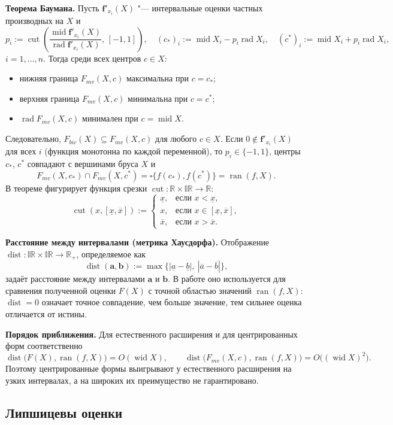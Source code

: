 \documentclass[12pt,a4paper]{article}
\newcommand{\ran}{\operatorname{ran}}
\newcommand{\rad}{\operatorname{rad}}
\newcommand{\wid}{\operatorname{wid}}
\newcommand{\Mid}{\operatorname{mid}}
\newcommand{\dist}{\operatorname{dist}}
\newcommand{\cut}{\operatorname{cut}}
\newcommand{\bff}{\mathbf{f}}
\begin{document}
\textbf{Теорема Баумана.} Пусть $\bff'_{x_i}(X)$ "--- интервальные оценки частных производных на $X$ и
\[
p_i:=\cut\!\left(\frac{\Mid\bff'_{x_i}(X)}{\rad\bff'_{x_i}(X)},\,[-1,1]\right),\quad
(c_{*})_i:=\Mid X_i-p_i\rad X_i,\quad (c^{*})_i:=\Mid X_i+p_i\rad X_i,
\]
$i=1,\dots,n$. Тогда среди всех центров $c\in X$:
\begin{itemize}
\item нижняя граница $F_{mv}(X,c)$ максимальна при $c=c_{*}$;
\item верхняя граница $F_{mv}(X,c)$ минимальна при $c=c^{*}$;
\item $\rad F_{mv}(X,c)$ минимален при $c=\Mid X$.
\end{itemize}
Следовательно, $F_{bic}(X)\subseteq F_{mv}(X,c)$ для любого $c\in X$. Если $0\notin\bff'_{x_i}(X)$ для всех $i$ (функция монотонна по каждой переменной), то $p_i\in\{-1,1\}$, центры $c_{*}$, $c^{*}$ совпадают с вершинами бруса $X$ и
\[
F_{mv}(X,c_{*})\cap F_{mv}(X,c^{*})=\square\{f(c_{*}),f(c^{*})\}=\ran(f,X).
\]
В теореме фигурирует функция срезки $\cut:\mathbb{R}\times\mathbb{IR}\to\mathbb{R}$:
\[
\cut(x,[\underline{x},\overline{x}]):=
\begin{cases}
\underline{x}, & \text{если } x<\underline{x},\\
x, & \text{если } x\in[\underline{x},\overline{x}],\\
\overline{x}, & \text{если } x>\overline{x}.
\end{cases}
\]

\textbf{Расстояние между интервалами (метрика Хаусдорфа).} Отображение $\dist:\mathbb{IR}\times\mathbb{IR}\to\mathbb{R}_{+}$, определяемое как
\[
\dist(\mathbf{a},\mathbf{b}):=\max\{|\underline{a}-\underline{b}|,\ |\overline{a}-\overline{b}|\},
\]
задаёт расстояние между интервалами $\mathbf{a}$ и $\mathbf{b}$. В работе оно используется для сравнения полученной оценки $F(X)$ с точной областью значений $\ran(f,X)$: $\dist=0$ означает точное совпадение, чем больше значение, тем сильнее оценка отличается от истины.

\textbf{Порядок приближения.} Для естественного расширения и для центрированных форм соответственно
\[
\dist\bigl(F(X),\ran(f,X)\bigr)=O(\wid X),\qquad
\dist\bigl(F_{mv}(X,c),\ran(f,X)\bigr)=O\bigl((\wid X)^2\bigr).
\]
Поэтому центрированные формы выигрывают у естественного расширения на узких интервалах, а на широких их преимущество не гарантировано.

\subsection*{Липшицевы оценки}
\end{document}
